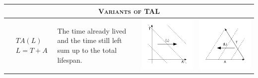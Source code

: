 \documentclass[11pt,oneside,a4paper]{article} %
\begin{document}
\begin{center}
\begin{longtable}{m{}m{}m{}m{}}
  \midrule
  \multicolumn{4}{c}{\textsc{Variants of TAL}}
  \\
  \midrule
  $$\begin{aligned}
    &TA(L) \\
    &L = T + A
  \end{aligned}$$ &
  The time already lived and the time still left sum up to the total lifespan. &
  \includegraphics[width = \linewidth]{Figures/JonasTable/TAl.pdf} &
  \includegraphics[width = \linewidth]{Figures/JonasTable/TAl_iso.pdf}  \\

\end{longtable}
\end{center}
\end{document}
